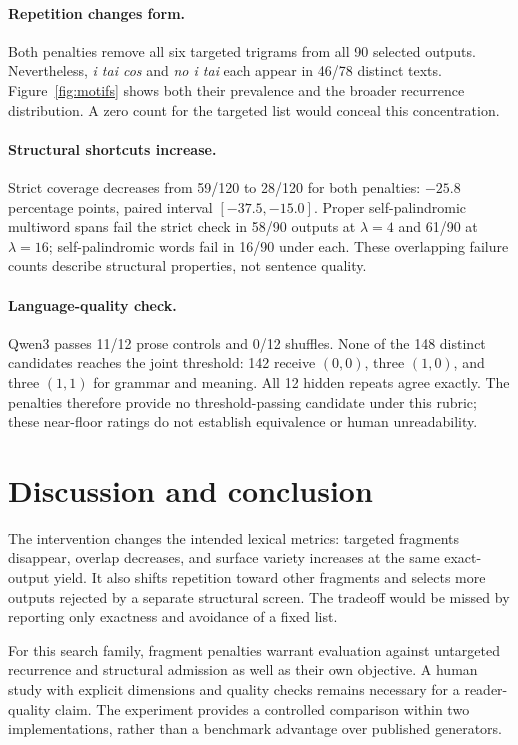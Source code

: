 \documentclass[11pt]{article}
\begin{document}
\paragraph{Repetition changes form.}
Both penalties remove all six targeted trigrams from all 90 selected outputs. Nevertheless, \emph{i tai cos} and \emph{no i tai} each appear in 46/78 distinct texts. Figure~\ref{fig:motifs} shows both their prevalence and the broader recurrence distribution. A zero count for the targeted list would conceal this concentration.

\paragraph{Structural shortcuts increase.}
Strict coverage decreases from 59/120 to 28/120 for both penalties: $-25.8$ percentage points, paired interval $[-37.5,-15.0]$. Proper self-palindromic multiword spans fail the strict check in 58/90 outputs at $\lambda=4$ and 61/90 at $\lambda=16$; self-palindromic words fail in 16/90 under each. These overlapping failure counts describe structural properties, not sentence quality.

\paragraph{Language-quality check.}
Qwen3 passes 11/12 prose controls and 0/12 shuffles. None of the 148 distinct candidates reaches the joint threshold: 142 receive $(0,0)$, three $(1,0)$, and three $(1,1)$ for grammar and meaning. All 12 hidden repeats agree exactly. The penalties therefore provide no threshold-passing candidate under this rubric; these near-floor ratings do not establish equivalence or human unreadability.

\section{Discussion and conclusion}
The intervention changes the intended lexical metrics: targeted fragments disappear, overlap decreases, and surface variety increases at the same exact-output yield. It also shifts repetition toward other fragments and selects more outputs rejected by a separate structural screen. The tradeoff would be missed by reporting only exactness and avoidance of a fixed list.

For this search family, fragment penalties warrant evaluation against untargeted recurrence and structural admission as well as their own objective. A human study with explicit dimensions and quality checks \citep{khashabi-etal-2022-genie} remains necessary for a reader-quality claim. The experiment provides a controlled comparison within two implementations, rather than a benchmark advantage over published generators.
\end{document}
